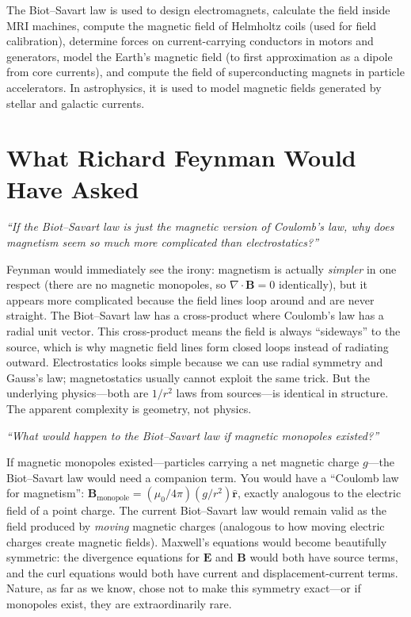 The Biot--Savart law is used to design electromagnets, calculate the field inside MRI machines, compute the magnetic field of Helmholtz coils (used for field calibration), determine forces on current-carrying conductors in motors and generators, model the Earth's magnetic field (to first approximation as a dipole from core currents), and compute the field of superconducting magnets in particle accelerators. In astrophysics, it is used to model magnetic fields generated by stellar and galactic currents.
\section*{What Richard Feynman Would Have Asked}

\textit{``If the Biot--Savart law is just the magnetic version of Coulomb's law, why does magnetism seem so much more complicated than electrostatics?''}

Feynman would immediately see the irony: magnetism is actually \emph{simpler} in one respect (there are no magnetic monopoles, so $\nabla\cdot\mathbf{B} = 0$ identically), but it appears more complicated because the field lines loop around and are never straight. The Biot--Savart law has a cross-product where Coulomb's law has a radial unit vector. This cross-product means the field is always ``sideways'' to the source, which is why magnetic field lines form closed loops instead of radiating outward. Electrostatics looks simple because we can use radial symmetry and Gauss's law; magnetostatics usually cannot exploit the same trick. But the underlying physics---both are $1/r^2$ laws from sources---is identical in structure. The apparent complexity is geometry, not physics.

\textit{``What would happen to the Biot--Savart law if magnetic monopoles existed?''}

If magnetic monopoles existed---particles carrying a net magnetic charge $g$---the Biot--Savart law would need a companion term. You would have a ``Coulomb law for magnetism'': $\mathbf{B}_{\text{monopole}} = (\mu_0/4\pi)(g/r^2)\hat{\mathbf{r}}$, exactly analogous to the electric field of a point charge. The current Biot--Savart law would remain valid as the field produced by \emph{moving} magnetic charges (analogous to how moving electric charges create magnetic fields). Maxwell's equations would become beautifully symmetric: the divergence equations for $\mathbf{E}$ and $\mathbf{B}$ would both have source terms, and the curl equations would both have current and displacement-current terms. Nature, as far as we know, chose not to make this symmetry exact---or if monopoles exist, they are extraordinarily rare.

